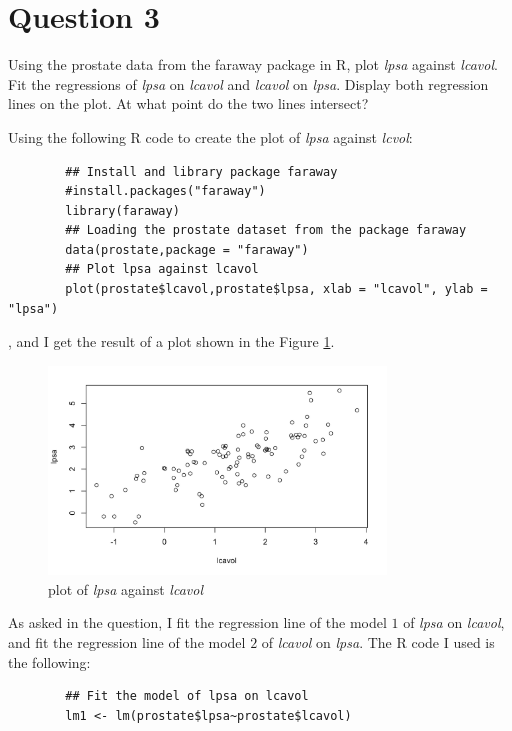 \section{Question 3}

\begin{question}
    Using the prostate data from the faraway package in R, plot \textit{lpsa} against \textit{lcavol}. Fit the regressions of \textit{lpsa} on \textit{lcavol} and \textit{lcavol} on \textit{lpsa}. Display both regression lines on the plot.
At what point do the two lines intersect?
\end{question}

\begin{answer}
    Using the following R code to create the plot of \textit{lpsa} against \textit{lcvol}:
    \begin{verbatim}
        ## Install and library package faraway
        #install.packages("faraway")
        library(faraway)
        ## Loading the prostate dataset from the package faraway
        data(prostate,package = "faraway")
        ## Plot lpsa against lcavol
        plot(prostate$lcavol,prostate$lpsa, xlab = "lcavol", ylab = "lpsa")
    \end{verbatim}
    , and I get the result of a plot shown in the Figure \ref{fig:fig1}.
    \begin{figure}[H]
        \centering
        \includegraphics[width=0.8\textwidth]{Figure 1.png}
        \caption{\label{fig:fig1}plot of \textit{lpsa} against \textit{lcavol}}
    \end{figure}
    As asked in the question, I fit the regression line of the model $1$ of \textit{lpsa} on \textit{lcavol}, and fit the regression line of the model $2$ of \textit{lcavol} on \textit{lpsa}. The R code I used is the following:
    \begin{verbatim}
        ## Fit the model of lpsa on lcavol
        lm1 <- lm(prostate$lpsa~prostate$lcavol)

\end{verbatim}
\end{answer}
